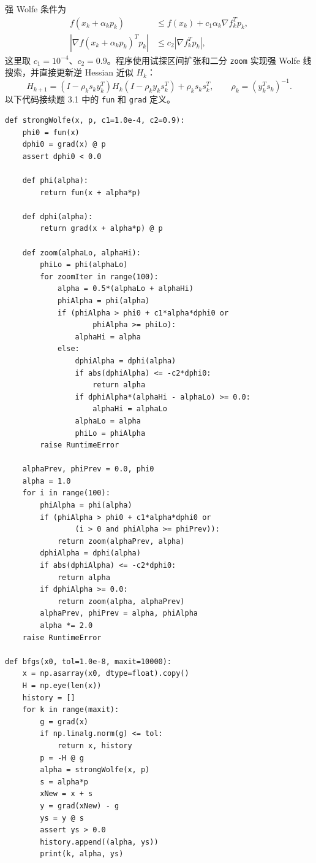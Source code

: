 \documentclass{ctexart}
\begin{document}
\begin{solution}
强 Wolfe 条件为
\[
\begin{split}
f(x_k+\alpha_kp_k)&\leq f(x_k)+c_1\alpha_k\nabla f_k^Tp_k,\\
|\nabla f(x_k+\alpha_kp_k)^Tp_k|&\leq c_2|\nabla f_k^Tp_k|,
\end{split}
\]
这里取 $c_1=10^{-4}$、$c_2=0.9$。程序使用试探区间扩张和二分
\texttt{zoom} 实现强 Wolfe 线搜索，并直接更新逆 Hessian 近似 $H_k$：
\[
    H_{k+1}=(I-\rho_ks_ky_k^T)H_k(I-\rho_ky_ks_k^T)
              +\rho_ks_ks_k^T,
    \qquad \rho_k=(y_k^Ts_k)^{-1}.
\]
以下代码接续题 3.1 中的 \texttt{fun} 和 \texttt{grad} 定义。

\begin{lstlisting}
def strongWolfe(x, p, c1=1.0e-4, c2=0.9):
    phi0 = fun(x)
    dphi0 = grad(x) @ p
    assert dphi0 < 0.0

    def phi(alpha):
        return fun(x + alpha*p)

    def dphi(alpha):
        return grad(x + alpha*p) @ p

    def zoom(alphaLo, alphaHi):
        phiLo = phi(alphaLo)
        for zoomIter in range(100):
            alpha = 0.5*(alphaLo + alphaHi)
            phiAlpha = phi(alpha)
            if (phiAlpha > phi0 + c1*alpha*dphi0 or
                    phiAlpha >= phiLo):
                alphaHi = alpha
            else:
                dphiAlpha = dphi(alpha)
                if abs(dphiAlpha) <= -c2*dphi0:
                    return alpha
                if dphiAlpha*(alphaHi - alphaLo) >= 0.0:
                    alphaHi = alphaLo
                alphaLo = alpha
                phiLo = phiAlpha
        raise RuntimeError

    alphaPrev, phiPrev = 0.0, phi0
    alpha = 1.0
    for i in range(100):
        phiAlpha = phi(alpha)
        if (phiAlpha > phi0 + c1*alpha*dphi0 or
                (i > 0 and phiAlpha >= phiPrev)):
            return zoom(alphaPrev, alpha)
        dphiAlpha = dphi(alpha)
        if abs(dphiAlpha) <= -c2*dphi0:
            return alpha
        if dphiAlpha >= 0.0:
            return zoom(alpha, alphaPrev)
        alphaPrev, phiPrev = alpha, phiAlpha
        alpha *= 2.0
    raise RuntimeError

def bfgs(x0, tol=1.0e-8, maxit=10000):
    x = np.asarray(x0, dtype=float).copy()
    H = np.eye(len(x))
    history = []
    for k in range(maxit):
        g = grad(x)
        if np.linalg.norm(g) <= tol:
            return x, history
        p = -H @ g
        alpha = strongWolfe(x, p)
        s = alpha*p
        xNew = x + s
        y = grad(xNew) - g
        ys = y @ s
        assert ys > 0.0
        history.append((alpha, ys))
        print(k, alpha, ys)


\end{lstlisting}
\end{solution}
\end{document}
